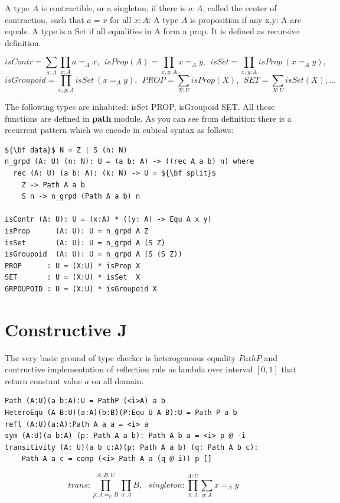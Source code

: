 \documentclass{svproc}
\begin{document}
A type $A$ is contractible, or a singleton, if there is $a : A$,
called the center of contraction, such that $a = x$ for all $x : A$:
A type $A$ is proposition if any x,y: A are equals.
A type is a Set if all equalities in A form a prop.
It is defined as recursive definition.

$$isContr = \sum_{a:A}\prod_{x:A} a =_A x,\ \ 
  isProp(A) = \prod_{x,y:A} x =_A y,\ \ 
  isSet = \prod_{x,y:A} isProp\ (x =_A y),\ \ $$
$$isGroupoid = \prod_{x,y:A} isSet\ (x =_A y),\ \ 
  PROP = \sum_{X:U}isProp(X),\ \ 
  SET = \sum_{X:U}isSet(X),...$$

The following types are inhabited: isSet PROP, isGroupoid SET.
All these functions are defined in {\bf path} module. As you can see
from definition there is a recurrent pattern which we encode in cubical syntax
as follows:

\begin{lstlisting}[mathescape=true]
${\bf data}$ N = Z | S (n: N)
n_grpd (A: U) (n: N): U = (a b: A) -> ((rec A a b) n) where
  rec (A: U) (a b: A): (k: N) -> U = ${\bf split}$
    Z -> Path A a b
    S n -> n_grpd (Path A a b) n

isContr (A: U): U = (x:A) * ((y: A) -> Equ A x y)
isProp      (A: U): U = n_grpd A Z
isSet       (A: U): U = n_grpd A (S Z)
isGroupoid  (A: U): U = n_grpd A (S (S Z))
PROP      : U = (X:U) * isProp X
SET       : U = (X:U) * isSet  X
GRPOUPOID : U = (X:U) * isGroupoid X
\end{lstlisting}

\section{Constructive J}

The very basic ground of type checker is heterogeneous equality $PathP$ and contructive
implementation of reflection rule as lambda over interval $[0,1]$ that
return constant value $a$ on all domain.

\begin{lstlisting}[mathescape=true]
Path (A:U)(a b:A):U = PathP (<i>A) a b
HeteroEqu (A B:U)(a:A)(b:B)(P:Equ U A B):U = Path P a b
refl (A:U)(a:A):Path A a a = <i> a
sym (A:U)(a b:A) (p: Path A a b): Path A b a = <i> p @ -i
transitivity (A: U)(a b c:A)(p: Path A a b) (q: Path A b c):
    Path A a c = comp (<i> Path A a (q @ i)) p []
\end{lstlisting}

$$trans : \prod_{p:A=_U B}^{A,B:U} \prod_{a:A} B,\ \ \ singleton : \prod_{x:A}^{A:U} \sum_{y:A} x =_A y $$
\end{document}
